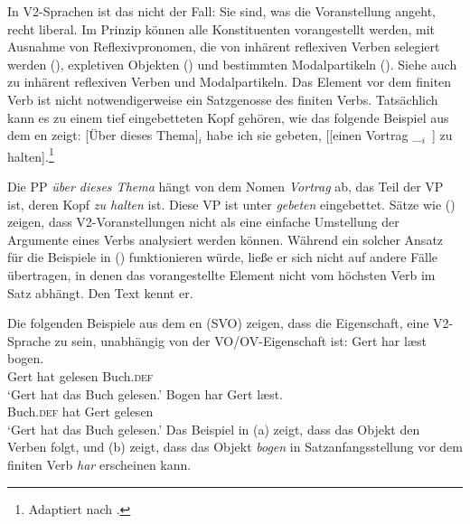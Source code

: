 \eal
\judgewidth{\%}
\zl
In V2-Sprachen ist das nicht der Fall: Sie sind, was die Voranstellung angeht, recht
liberal. Im Prinzip können alle Konstituenten vorangestellt werden, mit Ausnahme von Reflexiv\-pronomen,
die von inhärent reflexiven Verben selegiert werden (), expletiven Objekten () und bestimmten Modal\-partikeln (). Siehe auch  zu inhärent reflexiven
Verben und Modalpartikeln.
\eal
{}
\zl
\eal
{}
\zl
\eal
{}
\zl
Das Element vor dem finiten Verb ist nicht notwendigerweise ein Satzgenosse des finiten Verbs. Tatsächlich
kann es zu einem tief eingebetteten Kopf gehören, wie das folgende Beispiel aus dem
en zeigt:
\ea
{}[Über dieses Thema]$_i$ habe ich sie gebeten, [[einen Vortrag \_$_i$~] zu halten].\footnote{
Adaptiert nach .
}\german

\z
Die PP \emph{über dieses Thema} hängt von dem Nomen \emph{Vortrag} ab, das Teil der VP ist, deren Kopf
\emph{zu halten} ist. Diese VP ist unter \emph{gebeten} eingebettet. Sätze wie
() zeigen, dass V2-Voranstellungen nicht als eine einfache Umstellung der Argumente eines
Verbs analysiert werden können. Während ein solcher Ansatz für die Beispiele in () funktionieren würde, ließe er sich nicht auf andere
Fälle übertragen, in denen das vorangestellte Element nicht vom höchsten Verb im Satz abhängt.
\ea
Den Text kennt er.
\z

\noindent
Die folgenden Beispiele aus dem en (SVO) zeigen, dass die Eigenschaft, eine V2-Sprache
zu sein, unabhängig von der VO/OV-Eigenschaft ist:
\eal
\ex
\gll Gert har læst bogen.\\
     Gert hat gelesen Buch.\textsc{def}\\\danish
\glt `Gert hat das Buch gelesen.'
\ex
\gll Bogen har Gert læst.\\
     Buch.\textsc{def} hat Gert gelesen\\
\glt `Gert hat das Buch gelesen.'
\zl
Das Beispiel in (a) zeigt, dass das Objekt den Verben folgt, und (b) zeigt, dass das
Objekt \emph{bogen} in Satzanfangsstellung vor dem finiten Verb
\emph{har} erscheinen kann.

